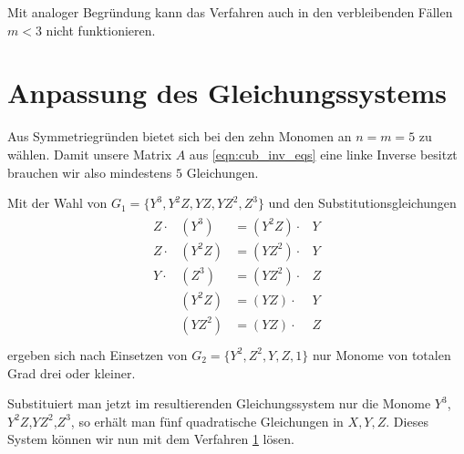 \documentclass[a4paper,twoside, 11pt]{book}
\theoremstyle{custom}
\theoremstyle{custom}
\begin{document}
Mit analoger Begründung kann das Verfahren auch in den verbleibenden Fällen $m<3$ nicht funktionieren.

\section{Anpassung des Gleichungssystems}
Aus Symmetriegründen bietet sich bei den zehn Monomen an $n=m=5$ zu wählen.
Damit unsere Matrix $A$ aus \eqref{eqn:cub_inv_eqs} eine linke Inverse besitzt brauchen wir also mindestens $5$ Gleichungen.

Mit der Wahl von $G_{1} = \{Y^{3},Y^{2}Z,YZ,YZ^{2},Z^{3}\}$ und den Substitutionsgleichungen
\begin{gather}
	\begin{alignedat}{-1}
	Z \cdot& \left( Y^{3}\right)  &= \left( Y^{2}Z\right) \cdot& Y\\
		Z\cdot& \left(Y^{2}Z\right) &= \left(YZ^{2}\right) \cdot& Y\\
		Y\cdot&\left( Z^{3}\right) &= \left(YZ^{2}\right) \cdot& Z\\
		&\left(Y^{2}Z\right)  &= \left(YZ\right) \cdot& Y\\
		&\left(YZ^{2}\right)  &= \left(YZ\right) \cdot& Z\\
	\end{alignedat}
\end{gather}
ergeben sich nach Einsetzen von $G_{2} = \{Y^2,Z^2,Y,Z,1\}$ nur Monome von totalen Grad drei oder kleiner.

Substituiert man jetzt im resultierenden Gleichungssystem nur die Monome $Y^{3}$,$Y^{2}Z$,$YZ^{2}$,$Z^{3}$, so erhält man fünf quadratische Gleichungen in $X,Y,Z$. Dieses System können wir nun mit dem Verfahren \ref{} lösen.
	\newpage
	\pagestyle{plain}
	\nocite{*}
	
\end{document}
